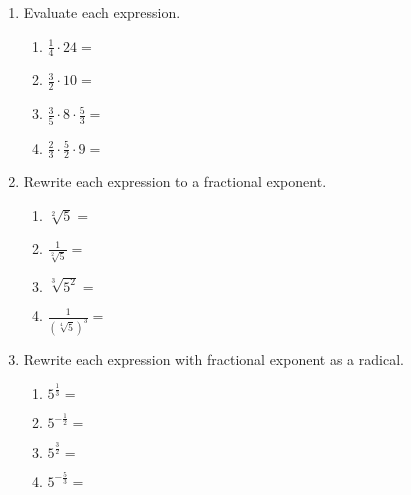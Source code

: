 \documentclass[12pt, twoside]{article}
\begin{document}
\begin{enumerate}
\item Evaluate each expression.
\begin{multicols}{2}
\begin{enumerate}[itemsep=0.5cm]
    \item $\displaystyle \frac{1}{4} \cdot 24 =$
    \item $\displaystyle \frac{3}{2} \cdot 10 =$
    \item $\displaystyle \frac{3}{5} \cdot 8 \cdot \frac{5}{3} =$
    \item $\displaystyle \frac{2}{3} \cdot \frac{5}{2} \cdot 9 =$
\end{enumerate}
\end{multicols} \vspace{0.5cm}

\item Rewrite each expression to a fractional exponent.
  \begin{multicols}{2}
    \begin{enumerate}[itemsep=1cm]
        \item $\sqrt[2]{5} =$
        \item $\displaystyle \frac{1}{\sqrt[2]{5}}=$
        \item $\sqrt[3]{5^2} =$
        \item $\displaystyle \frac{1}{(\sqrt[4]{5})^3}=$
    \end{enumerate}
    \end{multicols} \vspace{1cm}

\item Rewrite each expression with fractional exponent as a radical.
  \begin{multicols}{2}
    \begin{enumerate}[itemsep=1cm]
      \item $\displaystyle 5^{\frac{1}{3}}=$
      \item $\displaystyle 5^{-\frac{1}{2}}=$
      \item $\displaystyle 5^{\frac{3}{2}}=$
      \item $\displaystyle 5^{-\frac{5}{3}}=$
    \end{enumerate}
    \end{multicols}

\end{enumerate}
\end{document}
